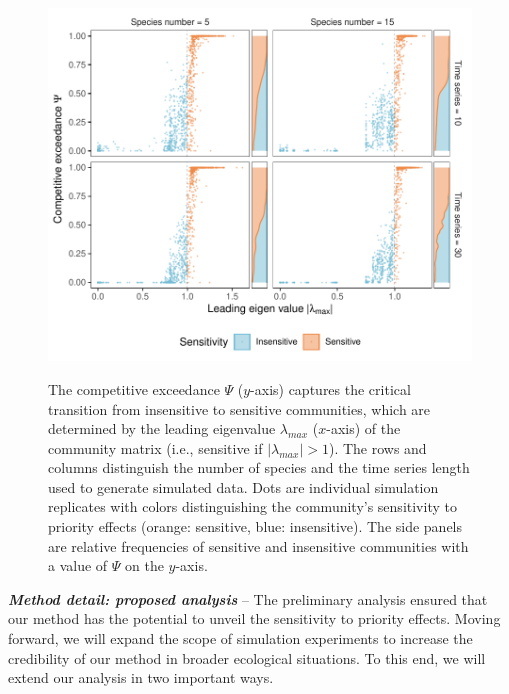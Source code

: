 \documentclass[12pt, class=article, crop=false]{standalone}
\begin{document}
\begin{figure}
    \caption{The competitive exceedance $\Psi$ ($y$-axis) captures the critical transition from insensitive to sensitive communities, which are determined by the leading eigenvalue $\lambda_{max}$ ($x$-axis) of the community matrix (i.e., sensitive if $|\lambda_{max}| > 1$).
    The rows and columns distinguish the number of species and the time series length used to generate simulated data.
    Dots are individual simulation replicates with colors distinguishing the community's sensitivity to priority effects (orange: sensitive, blue: insensitive).
    The side panels are relative frequencies of sensitive and insensitive communities with a value of $\Psi$ on the $y$-axis.}
    \includegraphics[scale=0.7]{output/figure_eigen_scatter.pdf}
    \label{fig:box}
\end{figure}

\textbf{\textit{Method detail: proposed analysis}} -- 
The preliminary analysis ensured that our method has the potential to unveil the sensitivity to priority effects.
Moving forward, we will expand the scope of simulation experiments to increase the credibility of our method in broader ecological situations.
To this end, we will extend our analysis in two important ways.
\end{document}
